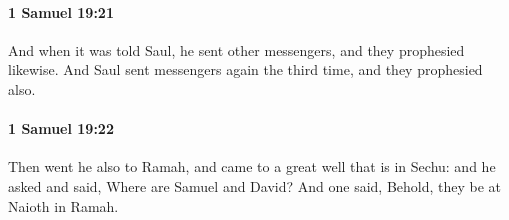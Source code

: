 		\paragraph{1 Samuel 19:21} %
			\label{1SAMUEL-19-21}

			And when it was told Saul, he sent other messengers, and they prophesied likewise. And Saul sent messengers again the third time, and they prophesied also.


		\paragraph{1 Samuel 19:22} %
			\label{1SAMUEL-19-22}

			Then went he also to Ramah, and came to a great well that is in Sechu: and he asked and said, Where are Samuel and David? And one said, Behold, they be at Naioth in Ramah.


